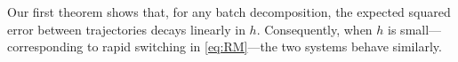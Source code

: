 \documentclass[twoside,11pt]{article}
\theoremstyle{plain}
\newtheorem{proposition}[theorem]{Proposition}
\def\R{\mathbb R}
\newcommand{\bfx}{\mathbf{x}}
\begin{document}





\medbreak 

Our first theorem shows that, for any batch decomposition, the expected squared error between trajectories decays linearly in $h$. Consequently, when $h$ is small---corresponding to rapid switching in \eqref{eq:RM}---the two systems behave similarly.
\end{document}

